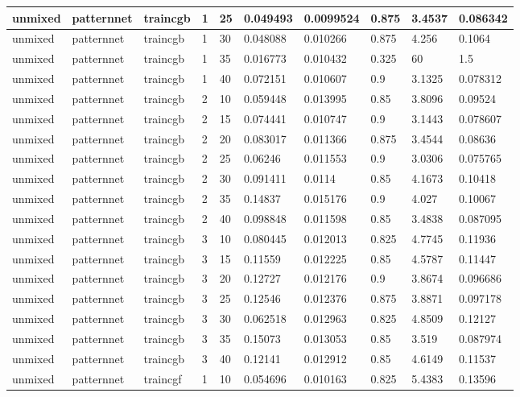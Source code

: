\begin{longtable}{lllllllll}
unmixed & patternnet & traincgb & 1 & 25 & 0.049493 & 0.0099524 & 0.875 & 3.4537 & 0.086342 \\ \hline 
unmixed & patternnet & traincgb & 1 & 30 & 0.048088 & 0.010266 & 0.875 & 4.256 & 0.1064 \\ \hline 
unmixed & patternnet & traincgb & 1 & 35 & 0.016773 & 0.010432 & 0.325 & 60 & 1.5 \\ \hline 
unmixed & patternnet & traincgb & 1 & 40 & 0.072151 & 0.010607 & 0.9 & 3.1325 & 0.078312 \\ \hline 
unmixed & patternnet & traincgb & 2 & 10 & 0.059448 & 0.013995 & 0.85 & 3.8096 & 0.09524 \\ \hline 
unmixed & patternnet & traincgb & 2 & 15 & 0.074441 & 0.010747 & 0.9 & 3.1443 & 0.078607 \\ \hline 
unmixed & patternnet & traincgb & 2 & 20 & 0.083017 & 0.011366 & 0.875 & 3.4544 & 0.08636 \\ \hline 
unmixed & patternnet & traincgb & 2 & 25 & 0.06246 & 0.011553 & 0.9 & 3.0306 & 0.075765 \\ \hline 
unmixed & patternnet & traincgb & 2 & 30 & 0.091411 & 0.0114 & 0.85 & 4.1673 & 0.10418 \\ \hline 
unmixed & patternnet & traincgb & 2 & 35 & 0.14837 & 0.015176 & 0.9 & 4.027 & 0.10067 \\ \hline 
unmixed & patternnet & traincgb & 2 & 40 & 0.098848 & 0.011598 & 0.85 & 3.4838 & 0.087095 \\ \hline 
unmixed & patternnet & traincgb & 3 & 10 & 0.080445 & 0.012013 & 0.825 & 4.7745 & 0.11936 \\ \hline 
unmixed & patternnet & traincgb & 3 & 15 & 0.11559 & 0.012225 & 0.85 & 4.5787 & 0.11447 \\ \hline 
unmixed & patternnet & traincgb & 3 & 20 & 0.12727 & 0.012176 & 0.9 & 3.8674 & 0.096686 \\ \hline 
unmixed & patternnet & traincgb & 3 & 25 & 0.12546 & 0.012376 & 0.875 & 3.8871 & 0.097178 \\ \hline 
unmixed & patternnet & traincgb & 3 & 30 & 0.062518 & 0.012963 & 0.825 & 4.8509 & 0.12127 \\ \hline 
unmixed & patternnet & traincgb & 3 & 35 & 0.15073 & 0.013053 & 0.85 & 3.519 & 0.087974 \\ \hline 
unmixed & patternnet & traincgb & 3 & 40 & 0.12141 & 0.012912 & 0.85 & 4.6149 & 0.11537 \\ \hline 
unmixed & patternnet & traincgf & 1 & 10 & 0.054696 & 0.010163 & 0.825 & 5.4383 & 0.13596 \\ \hline 

\end{longtable}

